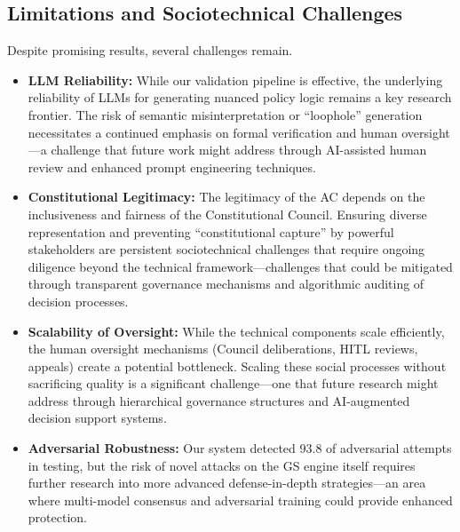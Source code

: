 \subsection{Limitations and Sociotechnical Challenges}
Despite promising results, several challenges remain.
\begin{itemize}[leftmargin=*,topsep=2pt,itemsep=2pt,parsep=0pt]
    \item \textbf{LLM Reliability:} While our validation pipeline is effective, the underlying reliability of LLMs for generating nuanced policy logic remains a key research frontier. The risk of semantic misinterpretation or ``loophole'' generation necessitates a continued emphasis on formal verification and human oversight—a challenge that future work might address through AI-assisted human review and enhanced prompt engineering techniques.
    \item \textbf{Constitutional Legitimacy:} The legitimacy of the AC depends on the inclusiveness and fairness of the Constitutional Council. Ensuring diverse representation and preventing ``constitutional capture'' by powerful stakeholders are persistent sociotechnical challenges that require ongoing diligence beyond the technical framework—challenges that could be mitigated through transparent governance mechanisms and algorithmic auditing of decision processes.
    \item \textbf{Scalability of Oversight:} While the technical components scale efficiently, the human oversight mechanisms (Council deliberations, HITL reviews, appeals) create a potential bottleneck. Scaling these social processes without sacrificing quality is a significant challenge—one that future research might address through hierarchical governance structures and AI-augmented decision support systems.
    \item \textbf{Adversarial Robustness:} Our system detected 93.8\percent{} of adversarial attempts in testing, but the risk of novel attacks on the GS engine itself requires further research into more advanced defense-in-depth strategies—an area where multi-model consensus and adversarial training could provide enhanced protection.
\end{itemize}
